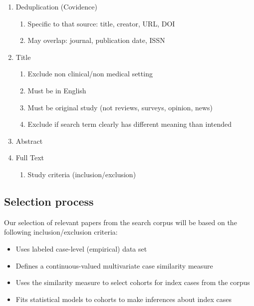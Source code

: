 \documentclass[preprint, 3p,
authoryear]{elsarticle} %
\providecommand{\tightlist}{%
  \setlength{\itemsep}{0pt}\setlength{\parskip}{0pt}}
\begin{document}
\begin{enumerate}
\def\labelenumi{\arabic{enumi}.}
\tightlist
\item
  Deduplication (Covidence)

  \begin{enumerate}
  \def\labelenumii{\alph{enumii}.}
  \tightlist
  \item
    Specific to that source: title, creator, URL, DOI
  \item
    May overlap: journal, publication date, ISSN
  \end{enumerate}
\item
  Title

  \begin{enumerate}
  \def\labelenumii{\alph{enumii}.}
  \tightlist
  \item
    Exclude non clinical/non medical setting
  \item
    Must be in English
  \item
    Must be original study (not reviews, surveys, opinion, news)
  \item
    Exclude if search term clearly has different meaning than intended
  \end{enumerate}
\item
  Abstract
\item
  Full Text

  \begin{enumerate}
  \def\labelenumii{\alph{enumii}.}
  \tightlist
  \item
    Study criteria (inclusion/exclusion)
  \end{enumerate}
\end{enumerate}

\hypertarget{selection-process}{%
\subsection{Selection process}\label{selection-process}}

\label{sec:appendix-selection}

Our selection of relevant papers from the search corpus will be based on
the following inclusion/exclusion criteria:

\begin{itemize}
\tightlist
\item
  Uses labeled case-level (empirical) data set
\item
  Defines a continuous-valued multivariate case similarity measure
\item
  Uses the similarity measure to select cohorts for index cases from the
  corpus
\item
  Fits statistical models to cohorts to make inferences about index
  cases
\end{itemize}
\end{document}
